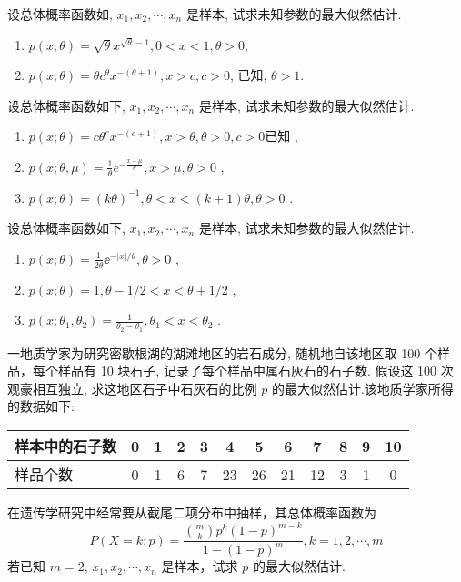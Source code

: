 \begin{xiti}
\item 设总体概率函数如, $x_1,x_2,\cdots,x_n$ 是样本, 试求未知参数的最大似然估计. 
\begin{enumerate}
  \item $p(x ; \theta)=\sqrt{\theta} x^{\sqrt{\theta}-1}, 0<x<1, \theta>0$, 
  \item $p(x ; \theta)=\theta c^{\theta} x^{-(\theta+1)}, x>c, c>0$, 已知,  $\theta>1$.
\end{enumerate}

\item 设总体概率函数如下, $x_1,x_2,\cdots,x_n$ 是样本, 试求未知参数的最大似然估计.
\begin{enumerate}
  \item $p(x ; \theta)=c \theta^{c} x^{-(c+1)}, x>\theta, \theta>0, c>0$已知 ,
  \item $p(x ; \theta, \mu)=\frac{1}{\theta} e^{-\frac{x-\mu}{\theta}}, x>\mu, \theta>0$ ,
  \item $p(x ; \theta)=(k \theta)^{-1}, \theta<x<(k+1) \theta, \theta>0$ .
\end{enumerate}

\item 设总体概率函数如下, $x_1,x_2,\cdots,x_n$ 是样本, 试求未知参数的最大似然估计.
\begin{enumerate}
  \item $p(x ; \theta)=\frac{1}{2\theta} \ee^{-|x| / \theta}, \theta>0$ ,
  \item $p(x ; \theta)=1, \theta-1 / 2<x<\theta+1 / 2$ ,
  \item $p\left(x ; \theta_{1}, \theta_{2}\right)=\frac{1}{\theta_{2}-\theta_{1}}, \theta_{1}<x<\theta_{2}$ .
\end{enumerate}
\item 一地质学家为研究密歇根湖的湖滩地区的岩石成分, 随机地自该地区取 100 个样品，每个样品有 10 块石子, 记录了每个样品中属石灰石的石子数. 假设这 100 次观豪相互独立, 求这地区石子中石灰石的比例 $p$ 的最大似然估计.该地质学家所得的数据如下:
\begin{center}
\begin{tabularx}{0.8\textwidth}{Z|*{10}{c|}c}
样本中的石子数 & 0 & 1 & 2 & 3 & 4 & 5 & 6 & 7 & 8 & 9 & 10\\
\midrule
样品个数 & 0 & 1 & 6 & 7 & 23 & 26 & 21 & 12 & 3 & 1 & 0
\end{tabularx}
\end{center}

\item 在遗传学研究中经常要从截尾二项分布中抽样，其总体概率函数为
\[P\left(X=k; p\right)=\frac{\binom mk p^{k}(1-p)^{m-k}}{1-(1-p)^{m}}, k=1,2, \cdots, m\]
若已知 $m=2$, $x_1,x_2,\cdots,x_n$ 是样本，试求 $p$ 的最大似然估计.


\end{xiti}
